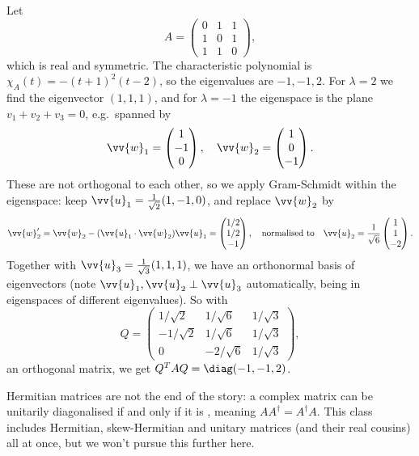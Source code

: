 \begin{example}
	Let
	$$
	A = \begin{pmatrix}
		0 & 1 & 1 \\ 1 & 0 & 1 \\ 1 & 1 & 0
	\end{pmatrix},
	$$
	which is real and symmetric. The characteristic polynomial is $\chi_A(t) = -(t+1)^2(t - 2)$, so the eigenvalues are $-1, -1, 2$. For $\lambda = 2$ we find the eigenvector $(1,1,1)$, and for $\lambda = -1$ the eigenspace is the plane $v_1 + v_2 + v_3 = 0$, e.g.\ spanned by
	$$
	\vv{w}_1 = \begin{pmatrix} 1 \\ -1 \\ 0\end{pmatrix}, \quad \vv{w}_2 = \begin{pmatrix} 1 \\ 0 \\ -1 \end{pmatrix}.
	$$
	These are not orthogonal to each other, so we apply Gram-Schmidt within the eigenspace: keep $\vv{u}_1 = \frac{1}{\sqrt{2}}(1, -1, 0)$, and replace $\vv{w}_2$ by
	$$
	\vv{w}_2' = \vv{w}_2 - (\vv{u}_1 \cdot \vv{w}_2)\vv{u}_1 = \begin{pmatrix} 1/2 \\ 1/2 \\ -1\end{pmatrix}, \quad \text{normalised to} \quad \vv{u}_2 = \frac{1}{\sqrt 6}\begin{pmatrix} 1 \\ 1 \\ -2 \end{pmatrix}.
	$$
	Together with $\vv{u}_3 = \frac{1}{\sqrt{3}}(1,1,1)$, we have an orthonormal basis of eigenvectors (note $\vv{u}_1, \vv{u}_2 \perp \vv{u}_3$ automatically, being in eigenspaces of different eigenvalues). So with
	$$
	Q = \begin{pmatrix}
		1/\sqrt 2 & 1/\sqrt 6 & 1/\sqrt 3 \\
		-1/\sqrt 2 & 1/\sqrt 6 & 1/\sqrt 3 \\
		0 & -2/\sqrt 6 & 1/\sqrt 3
	\end{pmatrix},
	$$
	an orthogonal matrix, we get $Q^TAQ = \diag(-1, -1, 2)$.
\end{example}

\begin{remark}
	Hermitian matrices are not the end of the story: a complex matrix can be unitarily diagonalised if and only if it is , meaning $A A^\dagger = A^\dagger A$. This class includes Hermitian, skew-Hermitian and unitary matrices (and their real cousins) all at once, but we won't pursue this further here.
\end{remark}

